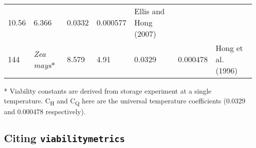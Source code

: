 \documentclass[]{article}
\begin{document}
\begin{longtable}[]{@{}lllllll@{}}
\begin{minipage}[t]{0.05\columnwidth}
10.56\strut
\end{minipage} & \begin{minipage}[t]{0.08\columnwidth}\raggedright
6.366\strut
\end{minipage} & \begin{minipage}[t]{0.08\columnwidth}\raggedright
0.0332\strut
\end{minipage} & \begin{minipage}[t]{0.08\columnwidth}\raggedright
0.000577\strut
\end{minipage} & \begin{minipage}[t]{0.23\columnwidth}\raggedright
Ellis and Hong (2007)\strut
\end{minipage}\tabularnewline
\begin{minipage}[t]{0.05\columnwidth}\raggedright
144\strut
\end{minipage} & \begin{minipage}[t]{0.23\columnwidth}\raggedright
\emph{Zea mays}*\strut
\end{minipage} & \begin{minipage}[t]{0.05\columnwidth}\raggedright
8.579\strut
\end{minipage} & \begin{minipage}[t]{0.08\columnwidth}\raggedright
4.91\strut
\end{minipage} & \begin{minipage}[t]{0.08\columnwidth}\raggedright
0.0329\strut
\end{minipage} & \begin{minipage}[t]{0.08\columnwidth}\raggedright
0.000478\strut
\end{minipage} & \begin{minipage}[t]{0.23\columnwidth}\raggedright
Hong et al. (1996)\strut
\end{minipage}\tabularnewline
\bottomrule
\end{longtable}

* Viability constants are derived from storage experiment at a single
temperature. C\textsubscript{H} and C\textsubscript{Q} here are the
universal temperature coefficients (0.0329 and 0.000478 respectively).

\hypertarget{citing-viabilitymetrics}{%
\subsection{\texorpdfstring{Citing
\texttt{viabilitymetrics}}{Citing viabilitymetrics}}\label{citing-viabilitymetrics}}
\end{document}
